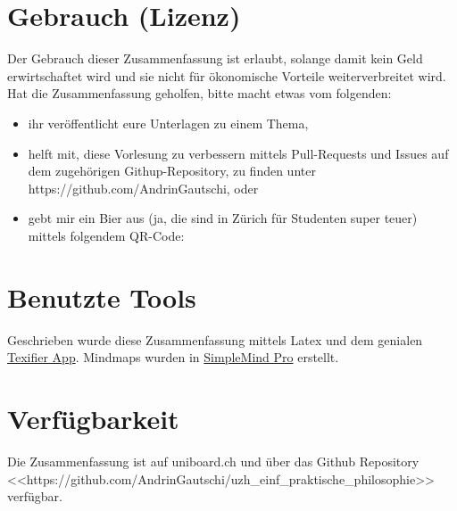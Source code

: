\documentclass[../main.tex]{subfiles}
\begin{document}
\section{Gebrauch (Lizenz)}
 Der Gebrauch dieser Zusammenfassung ist erlaubt, solange damit kein Geld erwirtschaftet wird und sie nicht für ökonomische Vorteile weiterverbreitet wird. Hat die Zusammenfassung geholfen, bitte macht etwas vom folgenden: 
\begin{itemize}
	\item ihr veröffentlicht eure Unterlagen zu einem Thema,
	\item helft mit, diese Vorlesung zu verbessern mittels Pull-Requests und Issues auf dem zugehörigen Githup-Repository, zu finden unter https://github.com/AndrinGautschi, oder
	\item gebt mir ein Bier aus (ja, die sind in Zürich für Studenten super teuer) mittels folgendem QR-Code:

	\begin{minipage}[t]{\linewidth}
          \raggedright
    \end{minipage}
\end{itemize}

\section{Benutzte Tools}
Geschrieben wurde diese Zusammenfassung mittels Latex und dem genialen \href{https://www.texifier.com/}{Texifier App}. Mindmaps wurden in \href{https://simplemind.eu/}{SimpleMind Pro} erstellt.   


\section{Verfügbarkeit}
Die Zusammenfassung ist auf uniboard.ch und über das Github Repository \\<<https://github.com/AndrinGautschi/uzh\_einf\_praktische\_philosophie>> verfügbar. 
\end{document}

